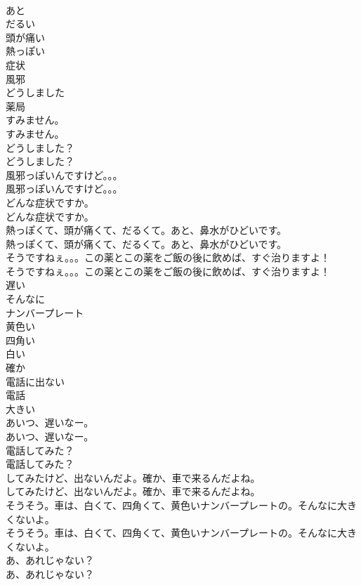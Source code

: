 \documentclass[8pt]{extreport}
\begin{document}
\begin{CJK}{UTF8}{min}
\\	あと
\\	だるい
\\	頭が痛い
\\	熱っぽい
\\	症状
\\	風邪
\\	どうしました
\\	薬局
\\	すみません。	
\\	すみません。 
\\	どうしました？	
\\	どうしました？ 
\\	風邪っぽいんですけど。。。	
\\	風邪っぽいんですけど。。。 
\\	どんな症状ですか。	
\\	どんな症状ですか。 
\\	熱っぽくて、頭が痛くて、だるくて。あと、鼻水がひどいです。	
\\	熱っぽくて、頭が痛くて、だるくて。あと、鼻水がひどいです。 
\\	そうですねぇ。。。この薬とこの薬をご飯の後に飲めば、すぐ治りますよ！	
\\	そうですねぇ。。。この薬とこの薬をご飯の後に飲めば、すぐ治りますよ！ 
\\	遅い
\\	そんなに
\\	ナンバープレート
\\	黄色い
\\	四角い
\\	白い
\\	確か
\\	電話に出ない
\\	電話
\\	大きい
\\	あいつ、遅いなー。	
\\	あいつ、遅いなー。 
\\	電話してみた？	
\\	電話してみた？ 
\\	してみたけど、出ないんだよ。確か、車で来るんだよね。	
\\	してみたけど、出ないんだよ。確か、車で来るんだよね。 
\\	そうそう。車は、白くて、四角くて、黄色いナンバープレートの。そんなに大きくないよ。	
\\	そうそう。車は、白くて、四角くて、黄色いナンバープレートの。そんなに大きくないよ。 
\\	あ、あれじゃない？	
\\	あ、あれじゃない？ 

\end{CJK}
\end{document}
